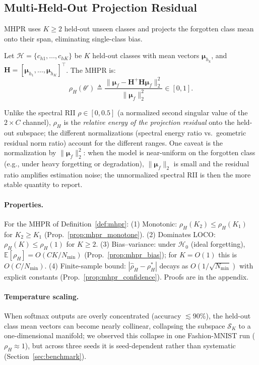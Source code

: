 \documentclass[smallextended]{svjour3}       %
\newcommand{\coloneqq}{\triangleq}
\begin{document}
\subsection{Multi-Held-Out Projection Residual}
\label{sec:mhpr}

MHPR uses $K \ge 2$ held-out unseen classes and projects the forgotten class mean onto their span, eliminating single-class bias.

\begin{definition}[MHPR]
\label{def:mhpr}
Let $\mathcal{H} = \{c_{h1},\dots,c_{hK}\}$ be $K$ held-out classes with mean vectors $\boldsymbol{\mu}_{h_k}$, and $\mathbf{H} = [\boldsymbol{\mu}_{h_1},\dots,\boldsymbol{\mu}_{h_K}]^\top$. The MHPR is:
\begin{equation}
\rho_H(\theta') \coloneqq \frac{\|\boldsymbol{\mu}_f - \mathbf{H}^+ \mathbf{H} \boldsymbol{\mu}_f\|_2^2}{\|\boldsymbol{\mu}_f\|_2^2} \in [0,1].
\end{equation}
\end{definition}

Unlike the spectral RII $\rho\in[0,0.5]$ (a normalized second singular value of the $2\times C$ channel), $\rho_H$ is the \emph{relative energy of the projection residual} onto the held-out subspace; the different normalizations (spectral energy ratio vs.\ geometric residual norm ratio) account for the different ranges. One caveat is the normalization by $\|\boldsymbol{\mu}_f\|_2^2$: when the model is near-uniform on the forgotten class (e.g., under heavy forgetting or degradation), $\|\boldsymbol{\mu}_f\|_2$ is small and the residual ratio amplifies estimation noise; the unnormalized spectral RII is then the more stable quantity to report.

\paragraph{Properties.}
For the MHPR of Definition~\ref{def:mhpr}: (1) Monotonic: $\rho_H(K_2) \le \rho_H(K_1)$ for $K_2 \ge K_1$ (Prop.~\ref{prop:mhpr_monotone}). (2) Dominates LOCO: $\rho_H(K) \le \rho_H(1)$ for $K\ge 2$. (3) Bias--variance: under $\mathcal{H}_0$ (ideal forgetting), $\mathbb{E}[\rho_H] = O(CK/N_{\min})$ (Prop.~\ref{prop:mhpr_bias}); for $K=O(1)$ this is $O(C/N_{\min})$. (4) Finite-sample bound: $|\hat{\rho}_H - \rho_H^*|$ decays as $O(1/\sqrt{N_{\min}})$ with explicit constants (Prop.~\ref{prop:mhpr_confidence}). Proofs are in the appendix.

\paragraph{Temperature scaling.}
When softmax outputs are overly concentrated (accuracy $\lesssim 90\%$), the held-out class mean vectors can become nearly collinear, collapsing the subspace $\mathcal{S}_K$ to a one-dimensional manifold; we observed this collapse in one Fashion-MNIST run ($\rho_H\approx1$), but across three seeds it is seed-dependent rather than systematic (Section~\ref{sec:benchmark}).
\end{document}
